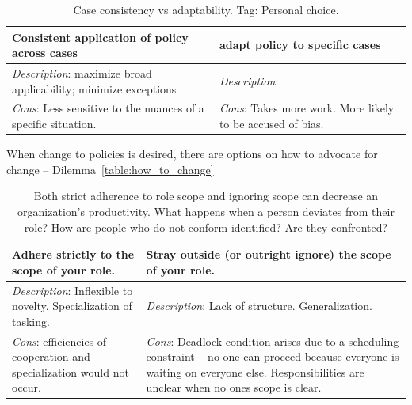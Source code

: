 \begin{center}
\begin{table}[ht]
\begin{tabular}{ | m{\dilemmatablewidth}| m{\dilemmatablewidth} | }
  \hline
  \textbf{Consistent application of policy across cases} &
  \textbf{adapt policy to specific cases} \\
  \hline
  \textit{Description}: maximize broad applicability; minimize exceptions &
  \textit{Description}:  \\  
  \hline
  \textit{Cons}: Less sensitive to the nuances of a specific situation. & 
  \textit{Cons}: Takes more work. More likely to be accused of bias. \\
  \hline
\end{tabular}
\caption{Case consistency vs adaptability.
{\tiny Tag: Personal choice.}
}
\label{table:policy_consistency_across_cases}
\end{table}
\end{center}

When change to policies is desired, there are options on how to advocate for change -- Dilemma~\ref{table:how_to_change} 

\begin{center}
\begin{table}[ht]
\begin{tabular}{ | m{\dilemmatablewidth}| m{\dilemmatablewidth} | } 
  \hline
  \textbf{Adhere strictly to the scope of your role.} & 
  \textbf{Stray outside (or outright ignore) the scope of your role.} \\ 
  \hline
  \textit{Description}: Inflexible to novelty. Specialization of tasking. & 
  \textit{Description}: Lack of structure. Generalization. \\ 
  \hline
  \textit{Cons}: efficiencies of cooperation and specialization would not occur. & 
  \textit{Cons}: Deadlock condition arises due to a scheduling constraint -- no one can proceed because everyone is waiting on everyone else. Responsibilities are unclear when no ones scope is clear. \\  
  \hline
\end{tabular}
\caption{Both strict adherence to role scope and ignoring scope can decrease an organization's productivity. 
What happens when a person deviates from their role?
How are people who do not conform identified? Are they confronted?
}
\label{table:scope_of_activity}
\end{table}
\end{center}

